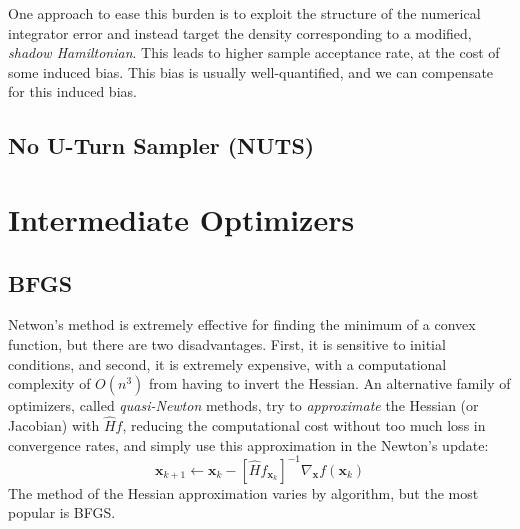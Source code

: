 \documentclass{article}
\begin{document}
    One approach to ease this burden is to exploit the structure of the numerical integrator error and instead target the density corresponding to a modified, \textit{shadow Hamiltonian}. This leads to higher sample acceptance rate, at the cost of some induced bias. This bias is usually well-quantified, and we can compensate for this induced bias. 

  \subsection{No U-Turn Sampler (NUTS)}

\section{Intermediate Optimizers}

  \subsection{BFGS}

    Netwon's method is extremely effective for finding the minimum of a convex function, but there are two disadvantages. First, it is sensitive to initial conditions, and second, it is extremely expensive, with a computational complexity of $O(n^3)$ from having to invert the Hessian. An alternative family of optimizers, called \textit{quasi-Newton} methods, try to \textit{approximate} the Hessian (or Jacobian) with $\hat{H} f$, reducing the computational cost without too much loss in convergence rates, and simply use this approximation in the Newton's update: 
    \[\mathbf{x}_{k+1} \gets \mathbf{x}_k - [\hat{H} f_{\mathbf{x}_k}]^{-1} \nabla_\mathbf{x} f (\mathbf{x}_k)\]
    The method of the Hessian approximation varies by algorithm, but the most popular is BFGS. 
\end{document}
